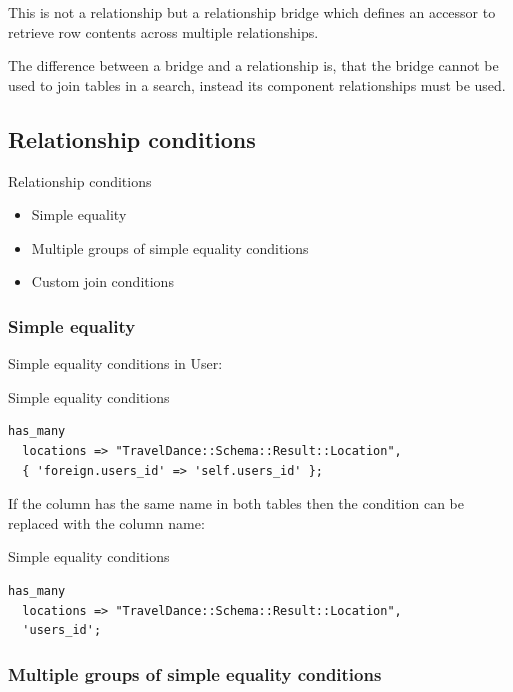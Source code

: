 This is not a relationship but a relationship bridge which defines an
accessor to retrieve row contents across multiple relationships.

The difference between a bridge and a relationship is, that the bridge
cannot be used to join tables in a search, instead its component
relationships must be used.

\subsection{Relationship conditions}

\begin{frame}{Relationship conditions}
\begin{itemize}
\item Simple equality
\item Multiple groups of simple equality conditions
\item Custom join conditions
\end{itemize}
\end{frame}

\subsubsection{Simple equality}

Simple equality conditions
in User:

\begin{frame}[fragile]{Simple equality conditions}
\begin{lstlisting}
has_many
  locations => "TravelDance::Schema::Result::Location",
  { 'foreign.users_id' => 'self.users_id' };
\end{lstlisting}
\end{frame}

If the column has the same name in both tables then the condition can be replaced with the column name:

\begin{frame}[fragile]{Simple equality conditions}
\begin{lstlisting}
has_many
  locations => "TravelDance::Schema::Result::Location",
  'users_id';
\end{lstlisting}
\end{frame}

\subsubsection{Multiple groups of simple equality conditions}

